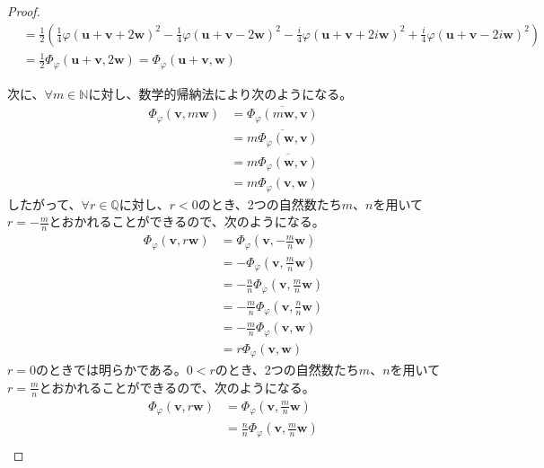 \documentclass[dvipdfmx]{jsarticle}
\begin{document}
\begin{proof}
\begin{align*}
&= \frac{1}{2}\left( \frac{1}{4}{\varphi\left( \mathbf{u} + \mathbf{v} + 2\mathbf{w} \right)}^{2} - \frac{1}{4}{\varphi\left( \mathbf{u} + \mathbf{v} - 2\mathbf{w} \right)}^{2} - \frac{i}{4}{\varphi\left( \mathbf{u} + \mathbf{v} + 2i\mathbf{w} \right)}^{2} + \frac{i}{4}{\varphi\left( \mathbf{u} + \mathbf{v} - 2i\mathbf{w} \right)}^{2} \right)\\
&= \frac{1}{2}\varPhi_{\varphi}\left( \mathbf{u} + \mathbf{v},2\mathbf{w} \right) = \varPhi_{\varphi}\left( \mathbf{u} + \mathbf{v},\mathbf{w} \right)
\end{align*}\par
次に、$\forall m \in \mathbb{N}$に対し、数学的帰納法により次のようになる。
\begin{align*}
\varPhi_{\varphi}\left( \mathbf{v},m\mathbf{w} \right) &= \overline{\varPhi_{\varphi}\left( m\mathbf{w},\mathbf{v} \right)}\\
&= \overline{m\varPhi_{\varphi}\left( \mathbf{w},\mathbf{v} \right)}\\
&= m\overline{\varPhi_{\varphi}\left( \mathbf{w},\mathbf{v} \right)}\\
&= m\varPhi_{\varphi}\left( \mathbf{v},\mathbf{w} \right)
\end{align*}
したがって、$\forall r \in \mathbb{Q}$に対し、$r < 0$のとき、2つの自然数たち$m$、$n$を用いて$r = - \frac{m}{n}$とおかれることができるので、次のようになる。
\begin{align*}
\varPhi_{\varphi}\left( \mathbf{v},r\mathbf{w} \right) &= \varPhi_{\varphi}\left( \mathbf{v}, - \frac{m}{n}\mathbf{w} \right)\\
&= - \varPhi_{\varphi}\left( \mathbf{v},\frac{m}{n}\mathbf{w} \right)\\
&= - \frac{n}{n}\varPhi_{\varphi}\left( \mathbf{v},\frac{m}{n}\mathbf{w} \right)\\
&= - \frac{m}{n}\varPhi_{\varphi}\left( \mathbf{v},\frac{n}{n}\mathbf{w} \right)\\
&= - \frac{m}{n}\varPhi_{\varphi}\left( \mathbf{v},\mathbf{w} \right)\\
&= r\varPhi_{\varphi}\left( \mathbf{v},\mathbf{w} \right)
\end{align*}
$r = 0$のときでは明らかである。$0 < r$のとき、2つの自然数たち$m$、$n$を用いて$r = \frac{m}{n}$とおかれることができるので、次のようになる。
\begin{align*}
\varPhi_{\varphi}\left( \mathbf{v},r\mathbf{w} \right) &= \varPhi_{\varphi}\left( \mathbf{v},\frac{m}{n}\mathbf{w} \right)\\
&= \frac{n}{n}\varPhi_{\varphi}\left( \mathbf{v},\frac{m}{n}\mathbf{w} \right)\\

\end{align*}
\end{proof}
\end{document}
